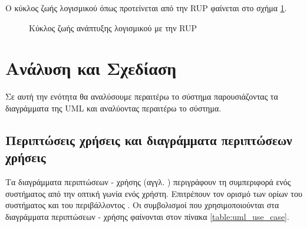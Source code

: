\documentclass{assignment}
\begin{document}
Ο κύκλος ζωής λογισμικού όπως προτείνεται από την RUP φαίνεται στο σχήμα \ref{fig:rup_cycle}.

\begin{figure}
\begin{center}
\caption{Κύκλος ζωής ανάπτυξης λογισμικού με την RUP \cite{wazlawick2014object}}
\label{fig:rup_cycle}
\end{center}
\end{figure}


\section{Ανάλυση και Σχεδίαση}
\label{section:diagrams}

Σε αυτή την ενότητα θα αναλύσουμε περαιτέρω το σύστημα παρουσιάζοντας τα διαγράμματα της UML και αναλύοντας περαιτέρω το σύστημα.

\subsection{Περιπτώσεις χρήσεις και διαγράμματα περιπτώσεων χρήσεις}

Τα διαγράμματα περιπτώσεων - χρήσης (αγγλ. ) περιγράφουν τη συμπεριφορά ενός συστήματος από την οπτική γωνία ενός χρήστη. Επιτρέπουν τον ορισμό των ορίων του συστήματος και του περιβάλλοντος \cite{virvou_uml}. Οι συμβολισμοί που χρησιμοποιούνται στα διαγράμματα περιπτώσεων - χρήσης φαίνονται στον πίνακα \ref{table:uml_use_case}.
\end{document}
